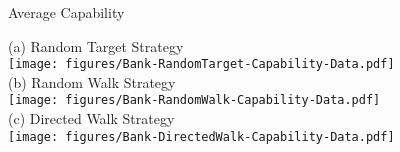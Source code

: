 \documentclass[preprint,1p,authoryear,times]{elsarticle}
\begin{document}
\begin{table}[htbp]
	\caption{Average Capability}	\label{tab:BankCapability}
	\begin{center}
	\scriptsize{(a) Random Target Strategy}\\
	\texttt{[image: figures/Bank-RandomTarget-Capability-Data.pdf]}\\
	\scriptsize{(b) Random Walk Strategy}\\
	\texttt{[image: figures/Bank-RandomWalk-Capability-Data.pdf]}\\
		\scriptsize{(c) Directed Walk Strategy}\\
	\texttt{[image: figures/Bank-DirectedWalk-Capability-Data.pdf]}\\
	\end{center}
\end{table}
\end{document}
